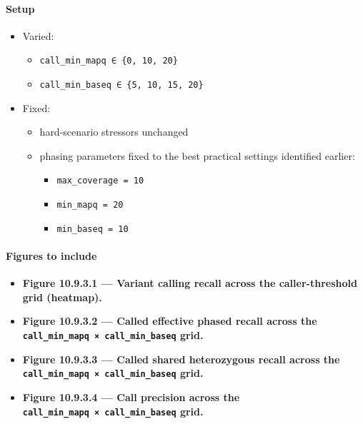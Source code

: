 \documentclass[
]{article}
\providecommand{\tightlist}{%
  \setlength{\itemsep}{0pt}\setlength{\parskip}{0pt}}
\begin{document}
\paragraph{Setup}\label{setup-9}

\begin{itemize}
\tightlist
\item
  Varied:

  \begin{itemize}
  \tightlist
  \item
    \texttt{call\_min\_mapq\ ∈\ \{0,\ 10,\ 20\}}
  \item
    \texttt{call\_min\_baseq\ ∈\ \{5,\ 10,\ 15,\ 20\}}
  \end{itemize}
\item
  Fixed:

  \begin{itemize}
  \tightlist
  \item
    hard-scenario stressors unchanged
  \item
    phasing parameters fixed to the best practical settings identified
    earlier:

    \begin{itemize}
    \tightlist
    \item
      \texttt{max\_coverage\ =\ 10}
    \item
      \texttt{min\_mapq\ =\ 20}
    \item
      \texttt{min\_baseq\ =\ 10}
    \end{itemize}
  \end{itemize}
\end{itemize}

\paragraph{Figures to include}\label{figures-to-include-9}

\begin{itemize}
\tightlist
\item
  \textbf{Figure 10.9.3.1 --- Variant calling recall across the
  caller-threshold grid (heatmap).}
\item
  \textbf{Figure 10.9.3.2 --- Called effective phased recall across the
  \texttt{call\_min\_mapq\ ×\ call\_min\_baseq} grid.}
\item
  \textbf{Figure 10.9.3.3 --- Called shared heterozygous recall across
  the \texttt{call\_min\_mapq\ ×\ call\_min\_baseq} grid.}
\item
  \textbf{Figure 10.9.3.4 --- Call precision across the
  \texttt{call\_min\_mapq\ ×\ call\_min\_baseq} grid.}
\end{itemize}
\end{document}
